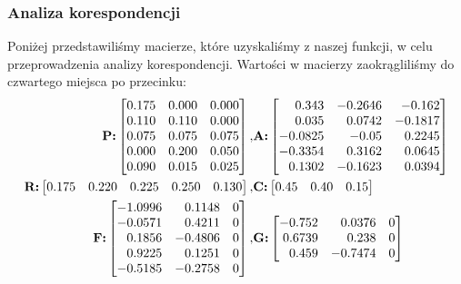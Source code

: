 \documentclass[12pt]{mwart}
\begin{document}
\subsubsection{Analiza korespondencji}
Poniżej przedstawiliśmy macierze, które uzyskaliśmy z naszej funkcji, w celu przeprowadzenia analizy korespondencji. Wartości w macierzy zaokrągliliśmy do czwartego miejsca po przecinku:
\begin{align}
	  \text{\textbf{P:}}
	  \begin{bmatrix*}[r]
			0.175 & 0.000 & 0.000 \\
			0.110 & 0.110 & 0.000 \\
			0.075 & 0.075 & 0.075 \\
			0.000 & 0.200 & 0.050 \\
			0.090 & 0.015 & 0.025
	\end{bmatrix*}, &
    \text{\textbf{A:}}
    \begin{bmatrix*}[r]
			0.343 & -0.2646 & -0.162 \\
			0.035 &  0.0742 & -0.1817 \\
			-0.0825 & -0.05 & 0.2245 \\
			-0.3354 & 0.3162 &  0.0645 \\
			0.1302 & -0.1623 &  0.0394
	\end{bmatrix*} \\
    \text{\textbf{R:}}
    \begin{bmatrix*}[r]
0.175 & 0.220 & 0.225 & 0.250 & 0.130
\end{bmatrix*}, &
    \text{\textbf{C:}}
\begin{bmatrix*}[r]
0.45 & 0.40 & 0.15
\end{bmatrix*} \\
    \text{\textbf{F:}}
    \begin{bmatrix*}[r]
			-1.0996 &  0.1148 & 0 \\
			-0.0571 & 0.4211 & 0 \\
			0.1856 & -0.4806 & 0 \\
			0.9225 &  0.1251 & 0 \\
			-0.5185 & -0.2758 & 0
			\end{bmatrix*}, &
    \text{\textbf{G:}}
    \begin{bmatrix*}[r]
			-0.752 &  0.0376 & 0 \\
			0.6739 &  0.238 & 0 \\
			0.459 & -0.7474 & 0
	\end{bmatrix*}
\end{align}
\end{document}
